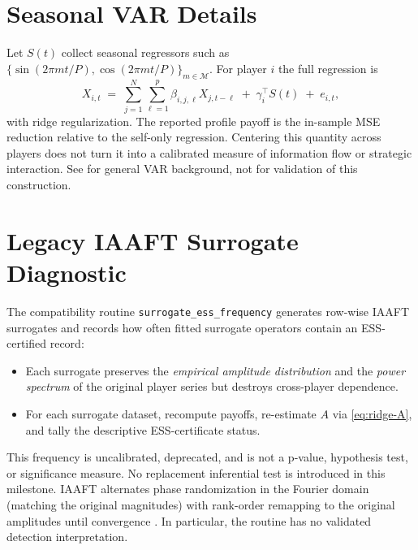 \documentclass[11pt]{article}
\begin{document}
\section{Seasonal VAR Details}
Let $S(t)$ collect seasonal regressors such as $\{\sin(2\pi m t/P),\cos(2\pi m t/P)\}_{m\in \mathcal{M}}$. For player $i$ the full regression is
\begin{equation}
X_{i,t} \;=\; \sum_{j=1}^N \sum_{\ell=1}^p \beta_{i,j,\ell} X_{j,t-\ell} \;+\; \gamma_i^\top S(t) \;+\; e_{i,t},
\end{equation}
with ridge regularization. The reported profile payoff is the in-sample MSE
reduction relative to the self-only regression. Centering this quantity across
players does not turn it into a calibrated measure of information flow or
strategic interaction. See \cite{lutkepohl} for general VAR background, not for
validation of this construction.

\section{Legacy IAAFT Surrogate Diagnostic}
The compatibility routine \texttt{surrogate\_ess\_frequency} generates row-wise IAAFT surrogates and records how often fitted surrogate operators contain an ESS-certified record:
\begin{itemize}[leftmargin=*]
\item Each surrogate preserves the \emph{empirical amplitude distribution} and the \emph{power spectrum} of the original player series but destroys cross-player dependence.
\item For each surrogate dataset, recompute payoffs, re-estimate $A$ via \eqref{eq:ridge-A}, and tally the descriptive ESS-certificate status.
\end{itemize}
This frequency is uncalibrated, deprecated, and is not a p-value, hypothesis test, or significance measure. No replacement inferential test is introduced in this milestone. IAAFT alternates phase randomization in the Fourier domain (matching the original magnitudes) with rank-order remapping to the original amplitudes until convergence \cite{schreiber-schmitz}.
In particular, the routine has no validated detection interpretation.
\end{document}
